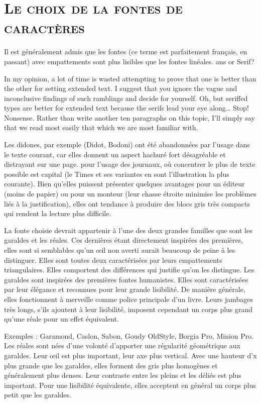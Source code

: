 \documentclass[12pt,a4paper,twocolumn]{book} %
\begin{document}
\section{\textsc{Le choix de la fontes de caractères}}
Il est généralement admis que les fontes (ce terme est parfaitement français, en passant) avec empattements sont plus lisibles que les fontes linéales.
ans or Serif?

In my opinion, a lot of time is wasted attempting to prove that one is better than the other for setting extended text. I suggest that you ignore the vague and inconclusive findings of such ramblings and decide for yourself. Oh, but seriffed types are better for extended text because the serifs lead your eye along… Stop! Nonsense.
Rather than write another ten paragraphs on this topic, I’ll simply say that we read most easily that which we are most familiar with. 


Les didones, par exemple (Didot, Bodoni) ont été abandonnées par l’usage dans le texte courant, car elles donnent un aspect hachuré fort désagréable et distrayant sur une page.
pour l’usage des journaux, où concentrer le plus de texte possible est capital (le Times et ses variantes en sont l’illustration la plus courante). Bien qu’elles puissent présenter quelques avantages pour un éditeur (moins de papier) ou pour un monteur (leur chasse étroite minimise les problèmes liés à la justification), elles ont tendance à produire des blocs gris très compacts qui rendent la lecture plus difficile.

La fonte choisie devrait appartenir à l’une des deux grandes familles que sont les garaldes et les réales. Ces dernières étant directement inspirées des premières, elles sont si semblables qu’un œil non averti aurait beaucoup de peine à les distinguer. Elles sont toutes deux caractérisées par leurs empattements triangulaires. Elles comportent des différences qui justifie qu’on les distingue.
Les garaldes sont inspirées des premières fontes humanistes. Elles sont caractérisées par leur élégance et reconnues pour leur grande lisibilité. De manière générale, elles fonctionnent à merveille comme police principale d’un livre. Leurs jambages très longs, s’ils ajoutent à leur lisibilité, imposent cependant un corps plus grand qu’une réale pour un effet équivalent.

Exemples : Garamond, Caslon, Sabon, Goudy OldStyle, Borgia Pro, Minion Pro.
Les réales sont nées d’une volonté d’apporter une régularité géométrique aux garaldes. Leur œil est plus important, leur axe plus vertical. Avec une hauteur d’x plus grande que les garaldes, elles forment des gris plus homogènes et généralement plus denses. Leur contraste entre les pleins et les déliés est plus important. Pour une lisibilité équivalente, elles acceptent en général un corps plus petit que les garaldes.
\end{document}
